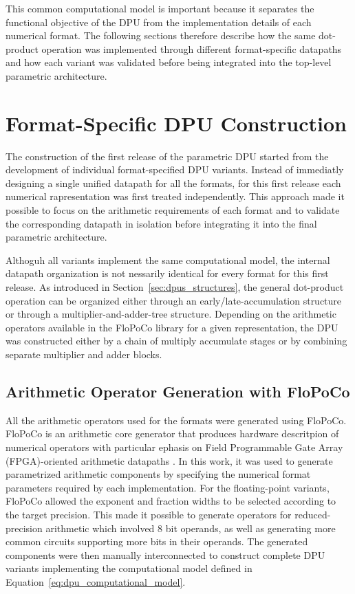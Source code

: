 This common computational model is important because it separates the functional objective of the DPU from the implementation details of each numerical format. The following sections therefore describe how the same dot-product operation was implemented through different format-specific datapaths and how each variant was validated before being integrated into the top-level parametric architecture.

\section{Format-Specific DPU Construction}

The construction of the first release of the parametric DPU started from the development of individual format-specified DPU variants. Instead of immediatly designing a single unified datapath for all the formats, for this first release each numerical rapresentation was first treated independently. This approach made it possible to focus on the arithmetic requirements of each format and to validate the corresponding datapath in isolation before integrating it into the final parametric architecture.

Althoguh all variants implement the same computational model, the internal datapath organization is not nessarily identical for every format for this first release. As introduced in Section~\ref{sec:dpus_structures}, the general dot-product operation can be organized either through an early/late-accumulation structure or through a multiplier-and-adder-tree structure. Depending on the arithmetic operators available in the FloPoCo library for a given representation, the DPU was constructed either by a chain of multiply accumulate stages or by combining separate multiplier and adder blocks.

\subsection{Arithmetic Operator Generation with FloPoCo}

All the arithmetic operators used for the formats were generated using FloPoCo. FloPoCo is an arithmetic core generator that produces hardware descritpion of numerical operators with particular ephasis on Field Programmable Gate Array (FPGA)-oriented arithmetic datapaths \cite{dedinechin2011flopoco}. In this work, it was used to generate parametrized arithmetic components by specifying the numerical format parameters required by each implementation.
For the floating-point variants, FloPoCo allowed the exponent and fraction widths to be selected according to the target precision. This made it possible to generate operators for reduced-precision arithmetic which involved 8 bit operands, as well as generating more common circuits supporting more bits in their operands. The generated components were then manually interconnected to construct complete DPU variants implementing the computational model defined in Equation~\eqref{eq:dpu_computational_model}.

